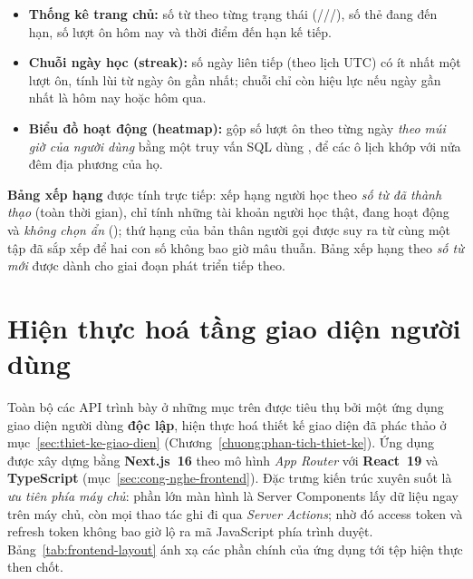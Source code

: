 \begin{itemize}
  \item \textbf{Thống kê trang chủ:} số từ theo từng trạng thái
        (///), số thẻ đang
        đến hạn, số lượt ôn hôm nay và thời điểm đến hạn kế tiếp.
  \item \textbf{Chuỗi ngày học (streak):} số ngày liên tiếp (theo lịch UTC) có
        ít nhất một lượt ôn, tính lùi từ ngày ôn gần nhất; chuỗi chỉ còn hiệu
        lực nếu ngày gần nhất là hôm nay hoặc hôm qua.
  \item \textbf{Biểu đồ hoạt động (heatmap):} gộp số lượt ôn theo từng ngày
        \textit{theo múi giờ của người dùng} bằng một truy vấn SQL dùng
        , để các ô lịch khớp với nửa đêm địa phương của họ.
\end{itemize}

\textbf{Bảng xếp hạng} được  tính trực tiếp: xếp hạng
người học theo \textit{số từ đã thành thạo} (toàn thời gian), chỉ tính những
tài khoản người học thật, đang hoạt động và \textit{không chọn ẩn}
(); thứ hạng của bản thân người gọi được suy ra từ
cùng một tập đã sắp xếp để hai con số không bao giờ mâu thuẫn. Bảng xếp hạng
theo \textit{số từ mới} được dành cho giai đoạn phát triển tiếp theo.

\section{Hiện thực hoá tầng giao diện người dùng}
\label{sec:hien-thuc-frontend}

Toàn bộ các API trình bày ở những mục trên được tiêu thụ bởi một ứng dụng giao
diện người dùng \textbf{độc lập}, hiện thực hoá thiết kế giao diện đã phác thảo
ở mục~\ref{sec:thiet-ke-giao-dien} (Chương~\ref{chuong:phan-tich-thiet-ke}).
Ứng dụng được xây dựng bằng \textbf{Next.js~16} theo mô hình \textit{App
Router} với \textbf{React~19} và \textbf{TypeScript} (mục~\ref{sec:cong-nghe-frontend}).
Đặc trưng kiến trúc xuyên suốt là \textit{ưu tiên phía máy chủ}: phần lớn màn
hình là Server Components lấy dữ liệu ngay trên máy chủ, còn mọi thao tác ghi
đi qua \textit{Server Actions}; nhờ đó access token và refresh token không bao
giờ lộ ra mã JavaScript phía trình duyệt. Bảng~\ref{tab:frontend-layout} ánh xạ
các phần chính của ứng dụng tới tệp hiện thực then chốt.

